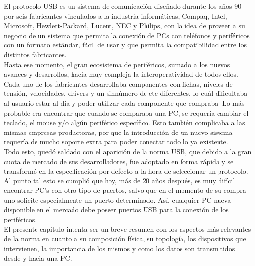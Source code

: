 El protocolo USB es un sistema de comunicación diseñado durante los años 90 por seis fabricantes vinculados a la industria informáticas, Compaq, Intel, Microsoft, Hewlett-Packard, Lucent, NEC y Philips, con la idea de proveer a su negocio de un sistema que permita la conexión de PCs con teléfonos y periféricos con un formato estándar, fácil de usar y que permita la compatibilidad entre los distintos fabricantes.\\

Hasta ese momento, el gran ecosistema de periféricos, sumado a los nuevos avances y desarrollos, hacia muy compleja la interoperatividad de todos ellos. Cada uno de los fabricantes desarrollaba componentes con fichas, niveles de tensión, velocidades, drivers y un sinnúmero de etc diferentes, lo cuál dificultaba al usuario estar al día y poder utilizar cada componente que compraba. Lo más probable era encontrar que cuando se comparaba una PC, se requería cambiar el teclado, el mouse y/o algún periférico específico. Esto también complicaba a las mismas empresas productoras, por que la introducción de un nuevo sistema requería de mucho soporte extra para poder conectar todo lo ya existente.\\

Todo esto, quedó saldado con el aparición de la norma USB, que debido a la gran cuota de mercado de sus desarrolladores, fue adoptado en forma rápida y se transformó en la especificación por defecto a la hora de seleccionar un protocolo. Al punto tal esto se cumplió que hoy, más de 20 años después, es muy difícil encontrar PC's con otro tipo de puertos, salvo que en el momento de su compra uno solicite especialmente un puerto determinado. Así, cualquier PC nueva disponible en el mercado debe poseer puertos USB para la conexión de los periféricos.\\

El presente capitulo intenta ser un breve resumen con los aspectos más relevantes de la norma en cuanto a su composición física, su topología, los dispositivos que intervienen, la importancia de los mismos y como los datos son transmitidos desde y hacia una PC.\\



